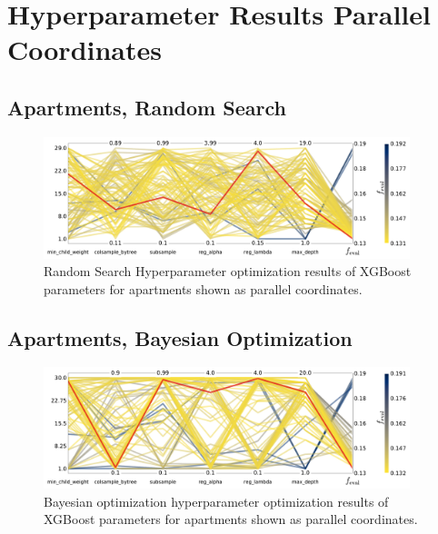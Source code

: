 \FloatBarrier
\section{Hyperparameter Results Parallel Coordinates}

\subsection*{Apartments, Random Search}
\begin{figure}[h!]
  \includegraphics[width=0.95\textwidth, trim=0 0 0 0, clip]{figures/housing/Ejerlejlighed_v19_cut_all_Ncols_all_CV_viz_HPO_RS.pdf}
  \caption[Parallel Coordinate Plot of the Hyperparameter Optimization for Apartments Using Random Search]
          {Random Search Hyperparameter optimization results of XGBoost parameters for apartments shown as parallel coordinates.} 
  \label{fig:h:CV_res_RS_parallel_coords_ejer}
\end{figure}
\vspace{3cm}
\FloatBarrier
\subsection*{Apartments, Bayesian Optimization}
\begin{figure}[h!]
  \includegraphics[width=0.95\textwidth, trim=0 0 0 0, clip]{figures/housing/Ejerlejlighed_v19_cut_all_Ncols_all_CV_viz_HPO_BO.pdf}
  \caption[Parallel Coordinate Plot of the Hyperparameter Optimization for Apartments Using Bayesian Optimization]
          {Bayesian optimization hyperparameter optimization results of XGBoost parameters for apartments shown as parallel coordinates.} 
  \label{fig:h:CV_res_BO_parallel_coords_ejer}
\end{figure}


